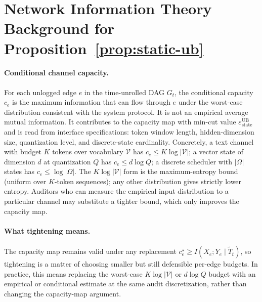   \section{Network Information Theory Background for
  Proposition~\ref{prop:static-ub}}
  \label{app:netinfo}

  \paragraph{Conditional channel capacity.}
  For each unlogged edge $e$ in the time-unrolled DAG $G_t$, the conditional
  capacity $c_e$ is the maximum information that can flow through $e$ under the
  worst-case distribution consistent with the system protocol. It is not an
  empirical average mutual information. It contributes to the capacity map with
  min-cut value $\varepsilon_\text{state}^\text{UB}$ and is read from interface
  specifications: token window length, hidden-dimension size, quantization
  level, and discrete-state cardinality. Concretely, a text channel
   with budget $K$ tokens over vocabulary $\mathcal{V}$ has $c_e \leq K \log
  |\mathcal{V}|$; a vector state of dimension $d$ at quantization $Q$ has $c_e
  \leq d \log Q$; a discrete scheduler with $|\Omega|$ states has $c_e \leq \log
   |\Omega|$. The $K \log |\mathcal{V}|$ form is the maximum-entropy bound
  (uniform over $K$-token sequences); any other distribution gives strictly
  lower entropy. Auditors who can measure the empirical input distribution to a
  particular channel may substitute a tighter bound, which only improves the
  capacity map.

  \paragraph{What tightening means.}
  The capacity map remains valid under any replacement $c_e^\star \geq
  I(X_e; Y_e \mid \tilde T_t)$, so tightening is a matter of choosing smaller
  but still defensible per-edge budgets. In practice, this means replacing the
  worst-case $K \log |\mathcal{V}|$ or $d \log Q$ budget with an empirical or
  conditional estimate at the same audit discretization, rather than changing
  the capacity-map argument.

